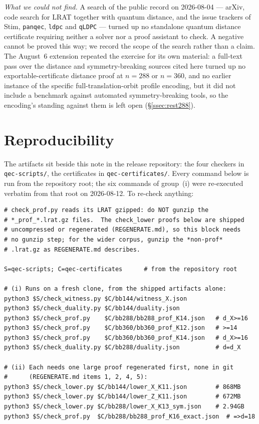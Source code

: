 \documentclass[11pt]{amsart}
\theoremstyle{plain}
\theoremstyle{definition}
\theoremstyle{remark}
\begin{document}
\emph{What we could not find.} A search of the public record on 2026-08-04 ---
arXiv, code search for LRAT together with quantum distance, and the issue
trackers of Stim, \texttt{panqec}, \texttt{ldpc} and \texttt{qLDPC} --- turned
up no standalone quantum distance certificate requiring neither a solver nor a
proof assistant to check. A negative cannot be proved this way; we record the
scope of the search rather than a claim. The August~6 extension repeated the
exercise for its own material: a full-text pass over the distance and
symmetry-breaking sources cited here turned up no exportable-certificate
distance proof at $n=288$ or $n=360$, and no earlier instance of the specific
full-translation-orbit profile encoding, but it did not include a benchmark
against automated symmetry-breaking tools, so the encoding's standing against
them is left open (\S\ref{ssec:rest288}).

\section{Reproducibility}\label{sec:repro}

The artifacts sit beside this note in the release repository: the four checkers
in \texttt{qec-scripts/}, the certificates in \texttt{qec-certificates/}. Every
command below is run from the repository root; the six commands of group~(i)
were re-executed verbatim from that root on 2026-08-12. To re-check anything:

\begin{verbatim}
# check_prof.py reads its LRAT gzipped: do NOT gunzip the
# *_prof_*.lrat.gz files.  The check_lower proofs below are shipped
# uncompressed or regenerated (REGENERATE.md), so this block needs
# no gunzip step; for the wider corpus, gunzip the *non-prof*
# .lrat.gz as REGENERATE.md describes.

S=qec-scripts; C=qec-certificates      # from the repository root

# (i) Runs on a fresh clone, from the shipped artifacts alone:
python3 $S/check_witness.py $C/bb144/witness_X.json
python3 $S/check_duality.py $C/bb144/duality.json
python3 $S/check_prof.py    $C/bb288/bb288_prof_K14.json   # d_X>=16
python3 $S/check_prof.py    $C/bb360/bb360_prof_K12.json   # >=14
python3 $S/check_prof.py    $C/bb360/bb360_prof_K14.json   # d_X>=16
python3 $S/check_duality.py $C/bb288/duality.json          # d=d_X

# (ii) Each needs one large proof regenerated first, none in git
#      (REGENERATE.md items 1, 2, 4, 5):
python3 $S/check_lower.py $C/bb144/lower_X_K11.json        # 868MB
python3 $S/check_lower.py $C/bb144/lower_Z_K11.json        # 672MB
python3 $S/check_lower.py $C/bb288/lower_X_K13_sym.json    # 2.94GB
python3 $S/check_prof.py  $C/bb288/bb288_prof_K16_exact.json  # =>d=18
\end{verbatim}
\end{document}
